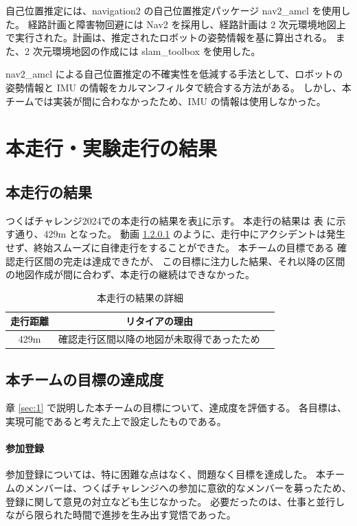 \documentclass[twocolumn,9pt]{jsproceedings}
\begin{document}
自己位置推定には、navigation2 の自己位置推定パッケージ nav2\_amcl \cite{nav2_amcl} を使用した。
経路計画と障害物回避には Nav2 \cite{nav2} を採用し、経路計画は 2 次元環境地図上で実行された。計画は、推定されたロボットの姿勢情報を基に算出される。
また、2 次元環境地図の作成には slam\_toolbox \cite{slam_toolbox} を使用した。

nav2\_amcl による自己位置推定の不確実性を低減する手法として、ロボットの姿勢情報と IMU の情報をカルマンフィルタで統合する方法がある。
しかし、本チームでは実装が間に合わなかったため、IMU の情報は使用しなかった。

\section{本走行・実験走行の結果}
\subsection{本走行の結果}

つくばチャレンジ2024での本走行の結果を表\ref{MainRun}に示す。
本走行の結果は 表 に示す通り、429m となった。
動画 \ref{} のように、走行中にアクシデントは発生せず、終始スムーズに自律走行をすることができた。
本チームの目標である 確認走行区間の完走は達成できたが、
この目標に注力した結果、それ以降の区間の地図作成が間に合わず、本走行の継続はできなかった。
\begin{table}[H]
  \caption{本走行の結果の詳細}
  \label{MainRun}
  \begin{tabular}{|c|c|p{4.0cm}|}
    \hline
    走行距離 & リタイアの理由 \\
    \hline
    429m   & 確認走行区間以降の地図が未取得であったため \\
    \hline
  \end{tabular}
\end{table}

\subsection{本チームの目標の達成度}

章 \ref{sec:1} で説明した本チームの目標について、達成度を評価する。
各目標は、実現可能であると考えた上で設定したものである。

\paragraph{参加登録}
参加登録については、特に困難な点はなく、問題なく目標を達成した。
本チームのメンバーは、つくばチャレンジへの参加に意欲的なメンバーを募ったため、登録に関して意見の対立なども生じなかった。
必要だったのは、仕事と並行しながら限られた時間で進捗を生み出す覚悟であった。
\end{document}
